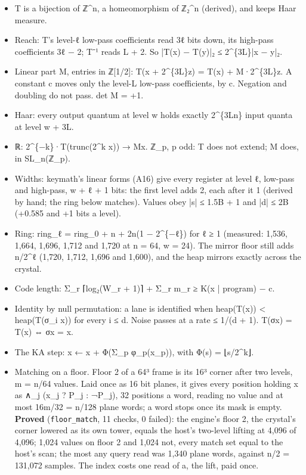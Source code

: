 \begin{itemize}
\begin{itemize}
\item T is a bijection of ℤ\textasciicircum{}n, a homeomorphism of ℤ₂\textasciicircum{}n (derived), and keeps Haar measure.
\item Reach: T's level-ℓ low-pass coefficients read 3ℓ bits down, its high-pass coefficients 3ℓ − 2; T⁻¹ reads L + 2. So |T(x) − T(y)|₂ ≤ 2\textasciicircum{}\{3L\}|x − y|₂.
\item Linear part M, entries in ℤ[1/2]: T(x + 2\textasciicircum{}\{3L\}z) = T(x) + M·2\textasciicircum{}\{3L\}z. A constant c moves only the level-L low-pass coefficients, by c. Negation and doubling do not pass. det M = +1.
\item Haar: every output quantum at level w holds exactly 2\textasciicircum{}\{3Ln\} input quanta at level w + 3L.
\item ℝ: 2\textasciicircum{}\{−k\}·T(trunc(2\textasciicircum{}k x)) → Mx. ℤ\_\allowbreak{}p, p odd: T does not extend; M does, in SL\_\allowbreak{}n(ℤ\_\allowbreak{}p).
\item Widths: keymath's linear forms (A16) give every register at level ℓ, low-pass and high-pass, w + ℓ + 1 bits: the first level adds 2, each after it 1 (derived by hand; the ring below matches). Values obey |s| ≤ 1.5B + 1 and |d| ≤ 2B (+0.585 and +1 bits a level).
\item Ring: ring\_\allowbreak{}ℓ = ring\_\allowbreak{}0 + n + 2n(1 − 2\textasciicircum{}\{−ℓ\}) for ℓ ≥ 1 (measured: 1,536, 1,664, 1,696, 1,712 and 1,720 at n = 64, w = 24). The mirror floor still adds n/2\textasciicircum{}ℓ (1,720, 1,712, 1,696 and 1,600), and the heap mirrors exactly across the crystal.
\item Code length: Σ\_\allowbreak{}r ⌈log₂(W\_\allowbreak{}r + 1)⌉ + Σ\_\allowbreak{}r m\_\allowbreak{}r ≥ K(x | program) − c.
\item Identity by null permutation: a lane is identified when heap(T(x)) < heap(T(σ\_\allowbreak{}i x)) for every i ≤ d. Noise passes at a rate ≤ 1/(d + 1). T(σx) = T(x) ⇔ σx = x.
\item The KA step: x ← x + Φ(Σ\_\allowbreak{}p φ\_\allowbreak{}p(x\_\allowbreak{}p)), with Φ(s) = ⌊s/2\textasciicircum{}k⌋.
\item Matching on a floor. Floor 2 of a 64³ frame is its 16³ corner after two levels, m = n/64 values. Laid once as 16 bit planes, it gives every position holding x as ∧\_\allowbreak{}j (x\_\allowbreak{}j ? P\_\allowbreak{}j : ¬P\_\allowbreak{}j), 32 positions a word, reading no value and at most 16m/32 = n/128 plane words; a word stops once its mask is empty. \textbf{Proved} (\texttt{floor\_\allowbreak{}match}, 11 checks, 0 failed): the engine's floor 2, the crystal's corner lowered as its own tower, equals the host's two-level lifting at 4,096 of 4,096; 1,024 values on floor 2 and 1,024 not, every match set equal to the host's scan; the most any query read was 1,340 plane words, against n/2 = 131,072 samples. The index costs one read of a, the lift, paid once.

\end{itemize}
\end{itemize}
